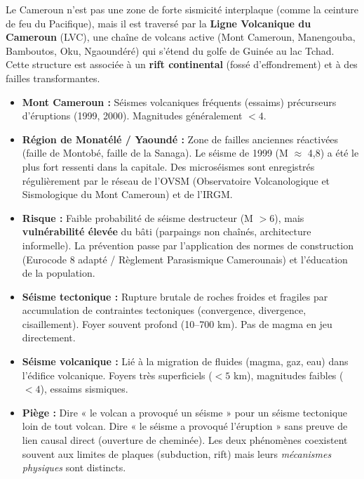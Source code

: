 \documentclass[11pt]{article}
\begin{document}
\begin{savaistu}
Le Cameroun n'est pas une zone de forte sismicité interplaque (comme la ceinture de feu du Pacifique), mais il est traversé par la \textbf{Ligne Volcanique du Cameroun} (LVC), une chaîne de volcans active (Mont Cameroun, Manengouba, Bamboutos, Oku, Ngaoundéré) qui s'étend du golfe de Guinée au lac Tchad. Cette structure est associée à un \textbf{rift continental} (fossé d'effondrement) et à des failles transformantes.
\begin{itemize}
    \item \textbf{Mont Cameroun :} Séismes volcaniques fréquents (essaims) précurseurs d'éruptions (1999, 2000). Magnitudes généralement $< 4$.
    \item \textbf{Région de Monatélé / Yaoundé :} Zone de failles anciennes réactivées (faille de Montobé, faille de la Sanaga). Le séisme de 1999 (M $\approx$ 4,8) a été le plus fort ressenti dans la capitale. Des microséismes sont enregistrés régulièrement par le réseau de l'OVSM (Observatoire Volcanologique et Sismologique du Mont Cameroun) et de l'IRGM.
    \item \textbf{Risque :} Faible probabilité de séisme destructeur (M $> 6$), mais \textbf{vulnérabilité élevée} du bâti (parpaings non chaînés, architecture informelle). La prévention passe par l'application des normes de construction (Eurocode 8 adapté / Règlement Parasismique Camerounais) et l'éducation de la population.
\end{itemize}
\end{savaistu}

\begin{attention}
\begin{itemize}
    \item \textbf{Séisme tectonique :} Rupture brutale de roches froides et fragiles par accumulation de contraintes tectoniques (convergence, divergence, cisaillement). Foyer souvent profond (10--700 km). Pas de magma en jeu directement.
    \item \textbf{Séisme volcanique :} Lié à la migration de fluides (magma, gaz, eau) dans l'édifice volcanique. Foyers très superficiels ($< 5$ km), magnitudes faibles ($< 4$), essaims sismiques.
    \item \textbf{Piège :} Dire « le volcan a provoqué un séisme » pour un séisme tectonique loin de tout volcan. Dire « le séisme a provoqué l'éruption » sans preuve de lien causal direct (ouverture de cheminée). Les deux phénomènes coexistent souvent aux limites de plaques (subduction, rift) mais leurs \emph{mécanismes physiques} sont distincts.
\end{itemize}
\end{attention}
\end{document}
